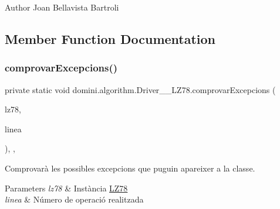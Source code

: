 \begin{DoxyAuthor}{Author}
Joan Bellavista Bartroli 
\end{DoxyAuthor}


\subsection{Member Function Documentation}
\mbox{\label{classdomini_1_1algorithm_1_1Driver____LZ78_a21b185a3310ced322a1eb1b49f889f15}} 
\subsubsection{\texorpdfstring{comprovar\+Excepcions()}{comprovarExcepcions()}}
{\footnotesize\ttfamily private static void domini.\+algorithm.\+Driver\+\_\+\+\_\+\+L\+Z78.\+comprovar\+Excepcions (\begin{DoxyParamCaption}\item[{\hyperlink{classdomini_1_1algorithm_1_1LZ78}{L\+Z78}}]{lz78,  }\item[{String}]{linea }\end{DoxyParamCaption})\hspace{0.3cm}{\ttfamily [inline]}, {\ttfamily [static]}, {\ttfamily [private]}}



Comprovarà les possibles excepcions que puguin apareixer a la classe. 


\begin{DoxyParams}{Parameters}
{\em lz78} & Instància \hyperlink{classdomini_1_1algorithm_1_1LZ78}{L\+Z78} \\
\hline
{\em linea} & Número de operació realitzada \\
\hline
\end{DoxyParams}
\mbox{\label{classdomini_1_1algorithm_1_1Driver____LZ78_a3f8db12503ffe92702d5b6670c56e792}} 

